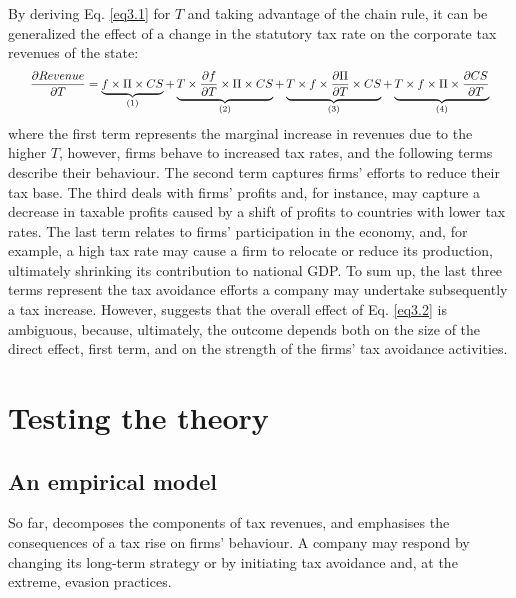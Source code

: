By deriving Eq. \ref{eq3.1} for $T$ and taking advantage of the chain rule, it can be generalized the effect of a change in the statutory tax rate on the corporate tax revenues of the state:
\vspace{-10pt}
\begin{equation}\label{eq3.2}
\scalemath{0.85}{
    \frac{\partial Revenue}{\partial T}=\underbrace{f\times \Pi \times CS}_{(1)}+\underbrace{T\times \frac{\partial f}{\partial T}\times \Pi \times CS}_{(2)}+\underbrace{T\times f\times \frac{\partial \Pi}{\partial T} \times CS}_{(3)}+\underbrace{T\times f\times \Pi \times \frac{\partial CS}{\partial T}}_{(4)}}
\end{equation}
where the first term represents the marginal increase in revenues due to the higher $T$, however, firms behave to increased tax rates, and the following terms describe their behaviour. The second term captures firms' efforts to reduce their tax base. The third deals with firms' profits and, for instance, may capture a decrease in taxable profits caused by a shift of profits to countries with lower tax rates. The last term relates to firms' participation in the economy, and, for example, a high tax rate may cause a firm to relocate or reduce its production, ultimately shrinking its contribution to national GDP. To sum up, the last three terms represent the tax avoidance efforts a company may undertake subsequently a tax increase. However, \textcite{clausing} suggests that the overall effect of Eq. \ref{eq3.2} is ambiguous, because, ultimately, the outcome depends both on the size of the direct effect, first term, and on the strength of the firms' tax avoidance activities.

\section{Testing the theory}

\subsection{An empirical model}

So far, \textcite{clausing} decomposes the components of tax revenues, and emphasises the consequences of a tax rise on firms' behaviour. A company may respond by changing its long-term strategy or by initiating tax avoidance and, at the extreme, evasion practices.

